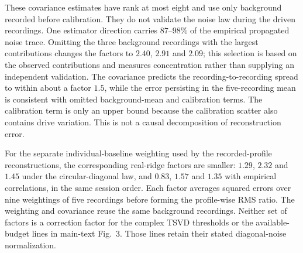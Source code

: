 \documentclass[pdflatex,sn-nature]{sn-jnl}%
\begin{document}
These covariance estimates have rank at most eight and use only background recorded before calibration. They do not validate the noise law during the driven recordings. One estimator direction carries $87$--$98\%$ of the empirical propagated noise trace. Omitting the three background recordings with the largest contributions changes the factors to $2.40$, $2.91$ and $2.09$; this selection is based on the observed contributions and measures concentration rather than supplying an independent validation. The covariance predicts the recording-to-recording spread to within about a factor $1.5$, while the error persisting in the five-recording mean is consistent with omitted background-mean and calibration terms. The calibration term is only an upper bound because the calibration scatter also contains drive variation. This is not a causal decomposition of reconstruction error.

For the separate individual-baseline weighting used by the recorded-profile reconstructions, the corresponding real-ridge factors are smaller: $1.29$, $2.32$ and $1.45$ under the circular-diagonal law, and $0.83$, $1.57$ and $1.35$ with empirical correlations, in the same session order. Each factor averages squared errors over nine weightings of five recordings before forming the profile-wise RMS ratio. The weighting and covariance reuse the same background recordings. Neither set of factors is a correction factor for the complex TSVD thresholds or the available-budget lines in main-text Fig.~3. Those lines retain their stated diagonal-noise normalization.

\clearpage
\end{document}
